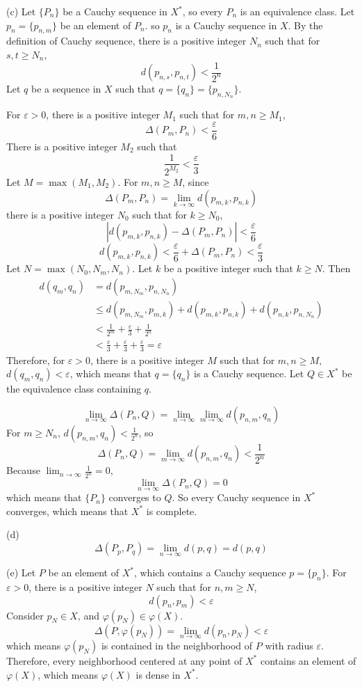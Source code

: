 \documentclass[a4paper]{article}
\begin{document}
(c)
Let $\{P_n\}$ be a Cauchy sequence in $X^*$, so every $P_n$ is an equivalence class. Let $p_n=\{p_{n,m}\}$ be an element of $P_n$. so $p_n$ is a Cauchy sequence in $X$. By the definition of Cauchy sequence, there is a positive integer $N_n$ such that for $s,t\geq N_n$,
\[
d(p_{n,s},p_{n,t})<\frac{1}{2^n}
\]
Let $q$ be a sequence in $X$ such that $q=\{q_n\}=\{p_{n,N_n}\}$.
\medskip

For $\varepsilon>0$, there is a positive integer $M_1$ such that for $m,n\geq M_1$,
\[
\Delta(P_m,P_n)<\frac{\varepsilon}{6}
\]
There is a positive integer $M_2$ such that
\[
\frac{1}{2^{M_2}}<\frac{\varepsilon}{3}
\]
Let $M=\max(M_1,M_2)$. For $m,n\geq M$, since 
\[
\Delta(P_m,P_n)=\lim_{k\to\infty}d(p_{m,k},p_{n,k})
\]
there is a positive integer $N_0$ such that for $k\geq N_0$,
\[
\left|d(p_{m,k},p_{n,k})-\Delta(P_m,P_n) \right|<\frac{\varepsilon}{6}
\]
\[
d(p_{m,k},p_{n,k})<\frac{\varepsilon}{6}+\Delta(P_m,P_n)<\frac{\varepsilon}{3}
\]
Let $N=\max(N_0,N_m,N_n)$. Let $k$ be a positive integer such that $k\geq N$. Then
\begin{equation*}
    \begin{split}
        d(q_m,q_n) & =d(p_{m,N_m},p_{n,N_n})\\
        & \leq d(p_{m,N_m},p_{m,k})+d(p_{m,k},p_{n,k})+d(p_{n,k},p_{n,N_n})\\
        & < \frac{1}{2^m}+\frac{\varepsilon}{3}+\frac{1}{2^n}\\
        & <\frac{\varepsilon}{3}+\frac{\varepsilon}{3}+\frac{\varepsilon}{3}=\varepsilon
    \end{split}
\end{equation*}
Therefore, for $\varepsilon>0$, there is a positive integer $M$ such that for $m,n\geq M$, \;$d(q_m,q_n)<\varepsilon$, which means that $q=\{q_n\}$ is a Cauchy sequence. Let $Q\in X^*$ be the equivalence class containing $q$.

\[
\lim_{n\to\infty}\Delta(P_n,Q)=\lim_{n\to\infty}\lim_{m\to\infty}d(p_{n,m},q_n)
\]
For $m\geq N_n$, \;$d(p_{n,m},q_n)<\frac{1}{2^n}$, so
\[
\Delta(P_n,Q)=\lim_{m\to\infty}d(p_{n,m},q_n)<\frac{1}{2^n}
\]
Because $\lim_{n\to\infty}\frac{1}{2^n}=0$,
\[
\lim_{n\to\infty}\Delta(P_n,Q)=0
\]
which means that $\{P_n\}$ converges to $Q$. So every Cauchy sequence in $X^*$ converges, which means that $X^*$ is complete.
\medskip

(d)
\[
\Delta(P_p,P_q)=\lim_{n\to\infty}d(p,q)=d(p,q)
\]
\medskip

(e)
Let $P$ be an element of $X^*$, which contains a Cauchy sequence $p=\{p_n\}$. For $\varepsilon>0$, there is a positive integer $N$ such that for $n,m\geq N$,
\[
d(p_n,p_m)<\varepsilon
\]
Consider $p_N\in X$, and $\varphi(p_N)\in\varphi(X)$.
\[
\Delta(P,\varphi(p_N))=\lim_{n\to\infty}d(p_n,p_N)<\varepsilon
\]
which means $\varphi(p_N)$ is contained in the neighborhood of $P$ with radius $\varepsilon$. Therefore, every neighborhood centered at any point of $X^*$ contains an element of $\varphi(X)$, which means $\varphi(X)$ is dense in $X^*$.
\end{document}
